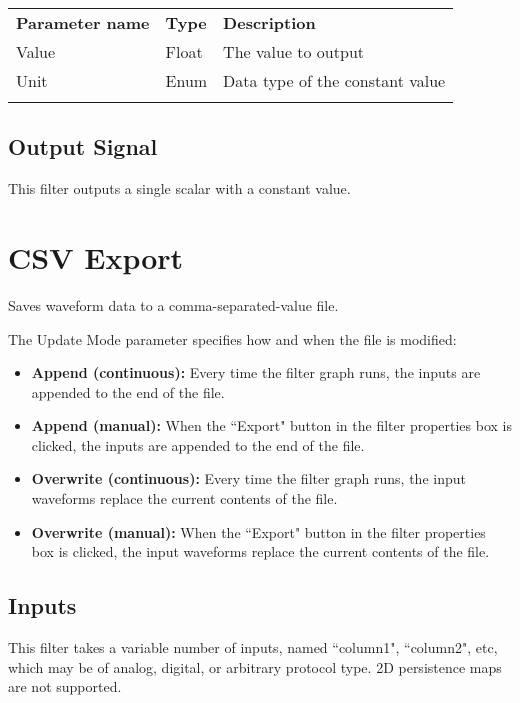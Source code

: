\begin{tabularx}{16cm}{llX}
\thickhline
\textbf{Parameter name} & \textbf{Type} & \textbf{Description} \\
\thickhline
Value & Float & The value to output\\
\thinhline
Unit & Enum & Data type of the constant value\\
\thickhline
\end{tabularx}

\subsection{Output Signal}

This filter outputs a single scalar with a constant value.

\pagebreak
\section{CSV Export}

Saves waveform data to a comma-separated-value file.

The Update Mode parameter specifies how and when the file is modified:
\begin{itemize}
\item \textbf{Append (continuous):} Every time the filter graph runs, the inputs are appended to the end of the file.
\item \textbf{Append (manual):} When the ``Export" button in the filter properties box is clicked,
the inputs are appended to the end of the file.
\item \textbf{Overwrite (continuous):} Every time the filter graph runs, the input waveforms replace the current contents
of the file.
\item \textbf{Overwrite (manual):} When the ``Export" button in the filter properties box is clicked,
the input waveforms replace the current contents of the file.
\end{itemize}

\subsection{Inputs}

This filter takes a variable number of inputs, named ``column1", ``column2", etc, which may be of analog, digital, or
arbitrary protocol type. 2D persistence maps are not supported.

